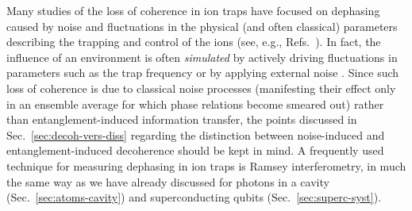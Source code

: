 \documentclass[3p,sort&compress]{elsarticle}
\begin{document}
Many studies of the loss of coherence in ion traps have focused on dephasing caused by noise and fluctuations in the physical (and often classical) parameters describing the trapping and control of the ions (see, e.g., Refs.~\cite{Turchette:2000:aa,Turchette:2000:oa,Brouard:2004:in,Grotz:2006:km,Stick:2006:aa,Seidelin:2006:rz,Haffner:2008:pp}). In fact, the influence of an environment is often \emph{simulated} by actively driving fluctuations in parameters such as the trap frequency or by applying external noise \cite{Myatt:2000:yy,Turchette:2000:aa}.  Since such loss of coherence is due to classical noise processes (manifesting their effect only in an ensemble average for which phase relations become smeared out) rather than entanglement-induced information transfer, the points discussed in Sec.~\ref{sec:decoh-vers-diss} regarding the distinction between noise-induced and entanglement-induced decoherence should be kept in mind. A frequently used technique for measuring dephasing in ion traps is Ramsey interferometry, in much the same way as we have already discussed for photons in a cavity (Sec.~\ref{sec:atoms-cavity}) and superconducting qubits (Sec.~\ref{sec:superc-syst}).
\end{document}
